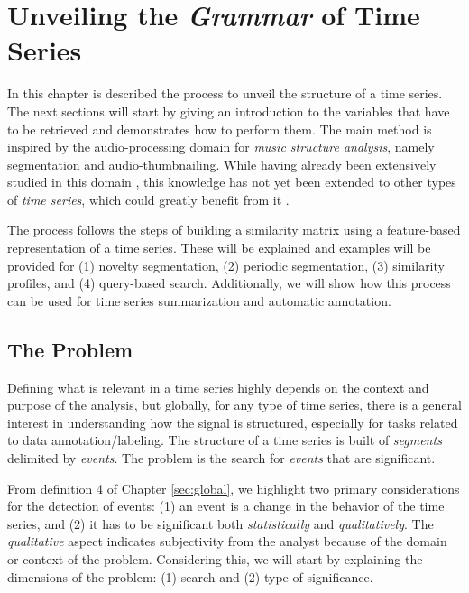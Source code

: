 
%

\chapter{Unveiling the \textit{Grammar} of Time Series}
\label{cha:methods1}

In this chapter is described the process to unveil the structure of a time series. The next sections will start by giving an introduction to the variables that have to be retrieved and demonstrates how to perform them. The main method is inspired by the audio-processing domain for \textit{music structure analysis}, namely segmentation and audio-thumbnailing. While having already been extensively studied in this domain \cite{fmp1, audiolabs1, audiolabs2, cpd_audio}, this knowledge has not yet been extended to other types of \textit{time series}, which could greatly benefit from it \cite{muller_music_health}. 
\par
The process follows the steps of building a similarity matrix using a feature-based representation of a time series. These will be explained and examples will be provided for (1) novelty segmentation, (2) periodic segmentation, (3) similarity profiles, and (4) query-based search. Additionally, we will show how this process can be used for time series summarization and automatic annotation.

\section{The Problem}

Defining what is relevant in a time series highly depends on the context and purpose of the analysis, but globally, for any type of time series, there is a general interest in understanding how the signal is structured, especially for tasks related to data annotation/labeling. The structure of a time series is built of \textit{segments} delimited by \textit{events}. The problem is the search for \textit{events} that are significant. 
\par
From definition 4 of Chapter \ref{sec:global}, we highlight two primary considerations for the detection of events: (1) an event is a change in the behavior of the time series, and (2) it has to be significant both \textit{statistically} and \textit{qualitatively}. The \textit{qualitative} aspect indicates subjectivity from the analyst because of the domain or context of the problem. Considering this, we will start by explaining the dimensions of the problem: (1) search and (2) type of significance. 

